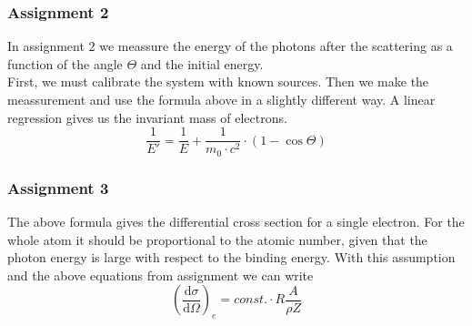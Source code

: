\newpage

\subsubsection{Assignment 2}
In assignment 2 we meassure the energy of the photons after the scattering as a function of the angle $\Theta$ and the initial energy. \\
First, we must calibrate the system with known sources. Then we make the meassurement and use the formula above in a slightly different way. A linear regression gives us the invariant mass of electrons.
$$\frac{1}{E'} = \frac{1}{E} + \frac{1}{m_0 \cdot c^{2}} \cdot (1 - \cos \Theta) $$

\subsubsection{Assignment 3}
The above formula gives the differential cross section for a single electron. For the whole atom it should be proportional to the atomic number, given that the photon energy is large with respect to the binding energy. With this assumption and the above equations from assignment we can write
$$(\frac{\mathrm{d}\sigma}{\mathrm{d}\Omega})_e = const. \cdot R \frac{A}{\rho Z} $$
